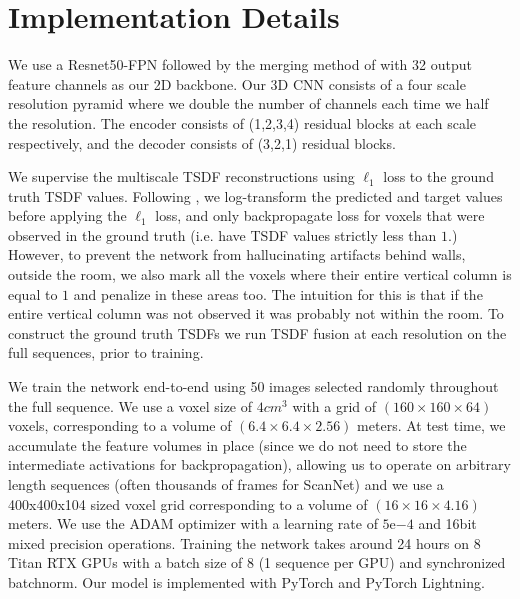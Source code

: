 \documentclass[runningheads]{llncs}
\begin{document}
\section{Implementation Details}




We use a Resnet50-FPN\cite{lin2017feature} followed by the merging method of \cite{kirillov2019panoptic} with 32 output feature channels as our 2D backbone.
Our 3D CNN consists of a four scale resolution pyramid where we double the number of channels each time we half the resolution.
The encoder consists of (1,2,3,4) residual blocks at each scale respectively, and the decoder consists of (3,2,1) residual blocks.

We supervise the multiscale TSDF reconstructions using $\ell_1$ loss to the ground truth TSDF values.
Following \cite{dai2016shape}, we log-transform the predicted and target values before applying the $\ell_1$ loss, 
and only backpropagate loss for voxels that were observed in the ground truth (i.e. have TSDF values strictly less than $1$.)
However, to prevent the network from hallucinating artifacts behind walls, outside the room, we also mark all the voxels where their entire vertical column is equal to $1$ and penalize in these areas too.
The intuition for this is that if the entire vertical column was not observed it was probably not within the room.
To construct the ground truth TSDFs we run TSDF fusion at each resolution on the full sequences, prior to training.

We train the network end-to-end using 50 images selected randomly throughout the full sequence.
We use a voxel size of $4cm^3$ with a grid of $(160\times160\times64)$ voxels, corresponding to a volume of $(6.4\times 6.4 \times 2.56)$ meters.
At test time, we accumulate the feature volumes in place (since we do not need to store the intermediate activations for backpropagation), allowing us to operate on arbitrary length sequences (often thousands of frames for ScanNet) and we use a 400x400x104 sized voxel grid corresponding to a volume of $(16\times16\times4.16)$ meters. 
We use the ADAM optimizer with a learning rate of $5\mathrm{e}{-4}$ and 16bit mixed precision operations.
Training the network takes around 24 hours on 8 Titan RTX GPUs with a batch size of 8 (1 sequence per GPU) and synchronized batchnorm. Our model is implemented with PyTorch and PyTorch Lightning\cite{falcon2019pytorch}.
\end{document}
